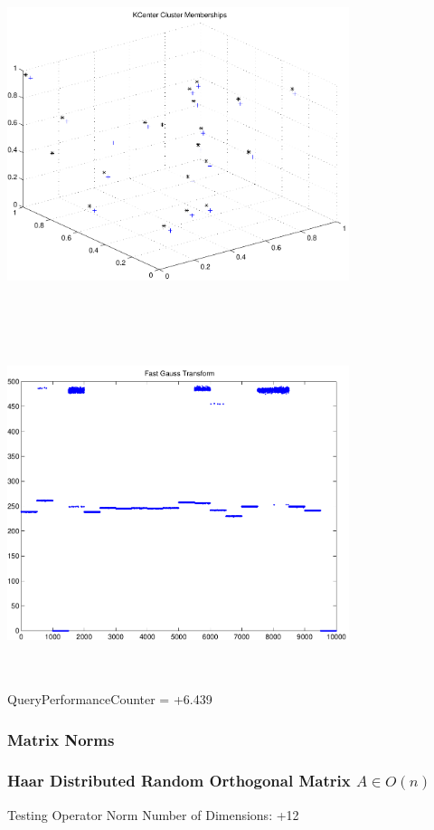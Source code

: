 \documentclass[9pt]{article}
\theoremstyle{plain}
\theoremstyle{definition}
\theoremstyle{remark}
\numberwithin{equation}{section}
\begin{document}
\includegraphics[width=10.0cm,height=10.0cm]{KCenterClusterMemberships_20_Centers.pdf}

\includegraphics[width=10.0cm,height=10.0cm]{FGT20_Centers.pdf}

QueryPerformanceCounter  =  +6.439
\subsubsection{Matrix Norms}
\subsubsection{Haar Distributed Random Orthogonal Matrix $A \in O(n)$}
 Testing Operator Norm
Number of Dimensions: +12
\end{document}

